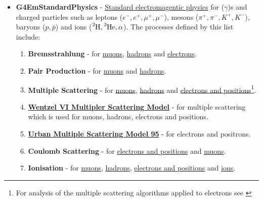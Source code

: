 \documentclass[8pt]{refart}
\begin{document}
\begin{itemize}
    \item \textbf{G4EmStandardPhysics} - \href{https://apc.u-paris.fr/~franco/g4doxy/html/classG4EmStandardPhysics.html}{Standard electromagentic physics} for ($\gamma$)s and charged particles such as leptons ($e^-,e^+,\mu^+,\mu^-$), mesons ($\pi^+,\pi^-,K^+,K^-$), baryons ($p, \bar{p}$) and ions ($\ce{^{2}H},\ce{^{3}He},\alpha$).  The processes defined by this list include:
    \begin{enumerate}[label=(\alph*)]
        \item \textbf{Bremsstrahlung} - for \href{https://apc.u-paris.fr/~franco/g4doxy/html/classG4MuBremsstrahlung.html}{muons}, \href{https://apc.u-paris.fr/~franco/g4doxy/html/classG4hBremsstrahlung.html}{hadrons} and \href{https://apc.u-paris.fr/~franco/g4doxy/html/classG4eBremsstrahlung.html}{electrons}.
        \item \textbf{Pair Production} - for \href{https://apc.u-paris.fr/~franco/g4doxy/html/classG4MuPairProduction.html}{muons} and \href{https://apc.u-paris.fr/~franco/g4doxy/html/classG4hPairProduction.html}{hadrons}.
        \item \textbf{Multiple Scattering} - for \href{https://apc.u-paris.fr/~franco/g4doxy/html/classG4MuMultipleScattering.html}{muons}, \href{https://apc.u-paris.fr/~franco/g4doxy/html/classG4hMultipleScattering.html}{hadrons} and \href{https://apc.u-paris.fr/~franco/g4doxy/html/classG4eMultipleScattering.html}{electrons and positions}\footnote{For analysis of the multiple scattering algorithms applied to electrons see \cite{Kim}}.
        \item \href{https://apc.u-paris.fr/~franco/g4doxy/html/classG4WentzelVIModel.html}{\textbf{Wentzel VI Multipler Scattering Model}} - for multiple scattering which is used for muons, hadrons, electrons and positions.
        \item \href{https://apc.u-paris.fr/~franco/g4doxy/html/classG4UrbanMscModel95.html}{\textbf{Urban Multiple Scattering Model 95}} - for electrons and positrons.
        \item \textbf{Coulomb Scattering} - for \href{https://apc.u-paris.fr/~franco/g4doxy/html/classG4eCoulombScatteringModel.html}{electrons and positions} and \href{https://apc.u-paris.fr/~franco/g4doxy/html/classG4CoulombScattering.html}{muons}.
        \item \textbf{Ionisation} - for \href{https://apc.u-paris.fr/~franco/g4doxy/html/classG4MuIonisation.html}{muons}, \href{https://apc.u-paris.fr/~franco/g4doxy/html/classG4hIonisation.html}{hadrons}, \href{https://apc.u-paris.fr/~franco/g4doxy/html/classG4eIonisation.html}{electrons and positions} and \href{https://apc.u-paris.fr/~franco/g4doxy/html/classG4ionIonisation.html}{ions}.

\end{enumerate}
\end{itemize}
\end{document}
